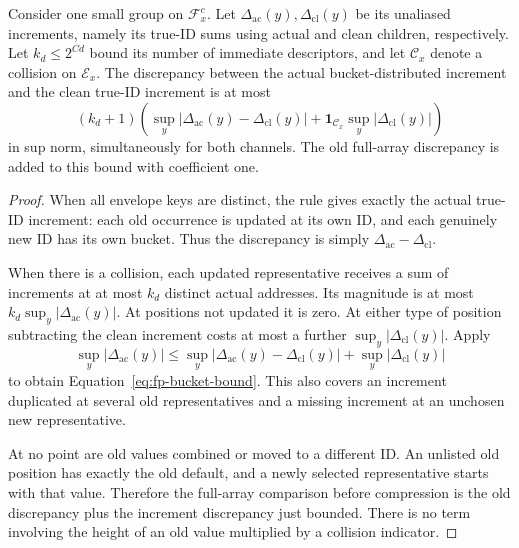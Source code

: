 \begin{lemma}\label{lem:fp-buckets}
Consider one small group on $\mathcal F_x^c$.  Let
$\Delta_{\mathrm{ac}}(y),\Delta_{\mathrm{cl}}(y)$ be its unaliased
increments, namely its true-ID sums using actual and clean children,
respectively.  Let $k_d\le2^{C d}$ bound its number of immediate
descriptors, and let $\mathcal C_x$ denote a collision on $\mathcal E_x$.
The discrepancy between the actual bucket-distributed increment and
the clean true-ID increment is at most
\begin{equation}
 (k_d+1)\left(
       \sup_y|\Delta_{\mathrm{ac}}(y)-\Delta_{\mathrm{cl}}(y)|
       +\mathbf1_{\mathcal C_x}\sup_y|\Delta_{\mathrm{cl}}(y)|
                  \right)
 \label{eq:fp-bucket-bound}
\end{equation}
in sup norm, simultaneously for both channels.  The old full-array
discrepancy is added to this bound with coefficient one.
\end{lemma}

\begin{proof}
When all envelope keys are distinct, the rule gives exactly the actual
true-ID increment: each old occurrence is updated at its own ID, and
each genuinely new ID has its own bucket.  Thus the discrepancy is
simply $\Delta_{\mathrm{ac}}-\Delta_{\mathrm{cl}}$.

When there is a collision, each updated representative receives a sum
of increments at at most $k_d$ distinct actual addresses.  Its magnitude
is at most $k_d\sup_y|\Delta_{\mathrm{ac}}(y)|$.  At positions not
updated it is zero.  At either type of position subtracting the clean
increment costs at most a further
$\sup_y|\Delta_{\mathrm{cl}}(y)|$.  Apply
\[
 \sup_y|\Delta_{\mathrm{ac}}(y)|
 \le\sup_y|\Delta_{\mathrm{ac}}(y)-\Delta_{\mathrm{cl}}(y)|
      +\sup_y|\Delta_{\mathrm{cl}}(y)|
\]
to obtain Equation~\eqref{eq:fp-bucket-bound}.  This also covers an
increment duplicated at several old representatives and a missing
increment at an unchosen new representative.

At no point are old values combined or moved to a different ID.  An
unlisted old position has exactly the old default, and a newly selected
representative starts with that value.  Therefore the full-array
comparison before compression is the old discrepancy plus the increment
discrepancy just bounded.  There is no term involving the height of an
old value multiplied by a collision indicator.
\end{proof}

